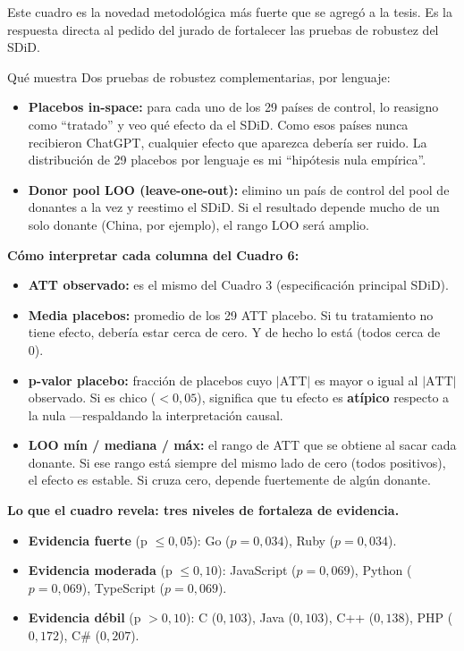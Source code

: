 \documentclass[11pt,a4paper]{article}
\begin{document}
Este cuadro es la novedad metodológica más fuerte que se agregó a la tesis. Es la respuesta directa al pedido del jurado de fortalecer las pruebas de robustez del SDiD.

\begin{lectura}{Qué muestra}
Dos pruebas de robustez complementarias, por lenguaje:
\begin{itemize}[leftmargin=*]
  \item \textbf{Placebos in-space:} para cada uno de los 29 países de control, lo reasigno como ``tratado'' y veo qué efecto da el SDiD. Como esos países nunca recibieron ChatGPT, cualquier efecto que aparezca debería ser ruido. La distribución de 29 placebos por lenguaje es mi ``hipótesis nula empírica''.
  \item \textbf{Donor pool LOO (leave-one-out):} elimino un país de control del pool de donantes a la vez y reestimo el SDiD. Si el resultado depende mucho de un solo donante (China, por ejemplo), el rango LOO será amplio.
\end{itemize}
\end{lectura}

\textbf{Cómo interpretar cada columna del Cuadro 6:}

\begin{itemize}[leftmargin=*]
  \item \textbf{ATT observado:} es el mismo del Cuadro 3 (especificación principal SDiD).
  \item \textbf{Media placebos:} promedio de los 29 ATT placebo. Si tu tratamiento no tiene efecto, debería estar cerca de cero. Y de hecho lo está (todos cerca de 0).
  \item \textbf{p-valor placebo:} fracción de placebos cuyo $|\text{ATT}|$ es mayor o igual al $|\text{ATT}|$ observado. Si es chico ($<0{,}05$), significa que tu efecto es \textbf{atípico} respecto a la nula —respaldando la interpretación causal.
  \item \textbf{LOO mín / mediana / máx:} el rango de ATT que se obtiene al sacar cada donante. Si ese rango está siempre del mismo lado de cero (todos positivos), el efecto es estable. Si cruza cero, depende fuertemente de algún donante.
\end{itemize}

\textbf{Lo que el cuadro revela: tres niveles de fortaleza de evidencia.}

\begin{itemize}[leftmargin=*]
  \item \textbf{Evidencia fuerte} (p $\leq 0{,}05$): Go ($p = 0{,}034$), Ruby ($p = 0{,}034$).
  \item \textbf{Evidencia moderada} (p $\leq 0{,}10$): JavaScript ($p = 0{,}069$), Python ($p = 0{,}069$), TypeScript ($p = 0{,}069$).
  \item \textbf{Evidencia débil} (p $> 0{,}10$): C ($0{,}103$), Java ($0{,}103$), C++ ($0{,}138$), PHP ($0{,}172$), C\# ($0{,}207$).
\end{itemize}
\end{document}
